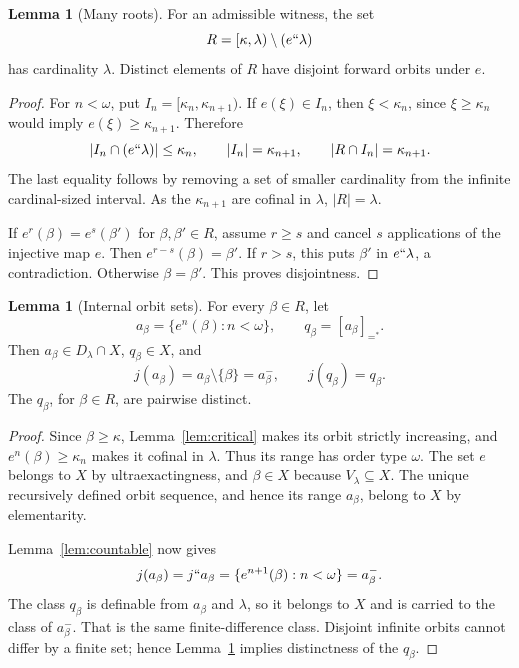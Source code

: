 \documentclass[11pt,letterpaper]{article}
\theoremstyle{definition}
\newtheorem{lemma}[definition]{Lemma}
\numberwithin{equation}{section}
\newcommand{\eqq}[1]{[#1]_{=^{*}}}
\begin{document}
\begin{lemma}[Many roots]\label{lem:roots}
For an admissible witness, the set
\[
R=[\kappa,\lambda)\setminus(e``\lambda)
\]
has cardinality $\lambda$. Distinct elements of $R$ have disjoint forward orbits under $e$.
\end{lemma}
\begin{proof}
For $n<\omega$, put $I_n=[\kappa_n,\kappa_{n+1})$. If $e(\xi)\in I_n$, then $\xi<\kappa_n$, since $\xi\ge\kappa_n$ would imply $e(\xi)\ge\kappa_{n+1}$. Therefore
\[
|I_n\cap(e``\lambda)|\le\kappa_n,
\qquad |I_n|=\kappa_{n+1},
\qquad |R\cap I_n|=\kappa_{n+1}.
\]
The last equality follows by removing a set of smaller cardinality from the infinite cardinal-sized interval. As the $\kappa_{n+1}$ are cofinal in $\lambda$, $|R|=\lambda$.

If $e^r(\beta)=e^s(\beta')$ for $\beta,\beta'\in R$, assume $r\ge s$ and cancel $s$ applications of the injective map $e$. Then $e^{r-s}(\beta)=\beta'$. If $r>s$, this puts $\beta'$ in $e``\lambda$, a contradiction. Otherwise $\beta=\beta'$. This proves disjointness.
\end{proof}

\begin{lemma}[Internal orbit sets]\label{lem:orbits}
For every $\beta\in R$, let
\[
a_\beta=\{e^n(\beta):n<\omega\},\qquad q_\beta=\eqq{a_\beta}.
\]
Then $a_\beta\in D_\lambda\cap X$, $q_\beta\in X$, and
\begin{equation}
j(a_\beta)=a_\beta\setminus\{\beta\}=a_\beta^-,
\qquad j(q_\beta)=q_\beta.\label{eq:orbit-shift}
\end{equation}
The $q_\beta$, for $\beta\in R$, are pairwise distinct.
\end{lemma}
\begin{proof}
Since $\beta\ge\kappa$, Lemma~\ref{lem:critical} makes its orbit strictly increasing, and $e^n(\beta)\ge\kappa_n$ makes it cofinal in $\lambda$. Thus its range has order type $\omega$. The set $e$ belongs to $X$ by ultraexactingness, and $\beta\in X$ because $V_\lambda\subseteq X$. The unique recursively defined orbit sequence, and hence its range $a_\beta$, belong to $X$ by elementarity.

Lemma~\ref{lem:countable} now gives
\[
j(a_\beta)=j``a_\beta
=\{e^{n+1}(\beta):n<\omega\}=a_\beta^-.
\]
The class $q_\beta$ is definable from $a_\beta$ and $\lambda$, so it belongs to $X$ and is carried to the class of $a_\beta^-$. That is the same finite-difference class. Disjoint infinite orbits cannot differ by a finite set; hence Lemma~\ref{lem:roots} implies distinctness of the $q_\beta$.
\end{proof}
\end{document}
